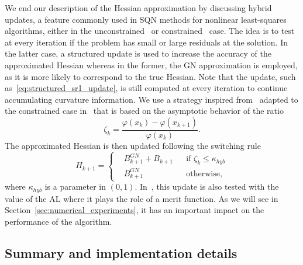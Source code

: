 \documentclass{article}
\numberwithin{equation}{section}
\theoremstyle{plain}
\begin{document}
	We end our description of the Hessian approximation by discussing hybrid updates, a feature commonly used in SQN methods for nonlinear least-squares algorithms, either in the unconstrained~\cite{dennisetal:1981,albaalifletcher:1985,fletcherxu:1987} or constrained~\cite{tjoabiegler:1991,li-etal:2002} case. The idea is to test at every iteration if the problem has small or large residuals at the solution. In the latter case, a structured update is used to increase the accuracy of the approximated Hessian whereas in the former, the GN approximation is employed, as it is more likely to correspond to the true Hessian. Note that the update, such as~\eqref{eq:structured_sr1_update}, is still computed at every iteration to continue accumulating curvature information. We use a strategy inspired from~\cite{fletcherxu:1987} adapted to the constrained case in~\cite{tjoabiegler:1991} that is based on the asymptotic behavior of the ratio
	\begin{equation*}
		\zeta_k = \dfrac{\varphi(x_{k})-\varphi(x_{k+1})}{\varphi(x_{k})}.
	\end{equation*}
	The approximated Hessian is then updated following the switching rule
	\begin{equation}\label{eq:hybrid_update_strategy}
		H_{k+1} = \left\{\begin{aligned}
			&B^{GN}_{k+1} + B_{k+1} & &\text{if } \zeta_k \le \kappa_{hyb} \\
			&B^{GN}_{k+1}  & & \text{otherwise}, 
		\end{aligned}\right.
	\end{equation}
	where $\kappa_{hyb}$ is a parameter in $(0,1)$. In~\cite{tjoabiegler:1991}, this update is also tested with the value of the AL where it plays the role of a merit function. As we will see in Section~\ref{sec:numerical_experiments}, it has an important impact on the performance of the algorithm.
	
	\subsection{Summary and implementation details}\label{subsec:implementation_details}
	
\end{document}
